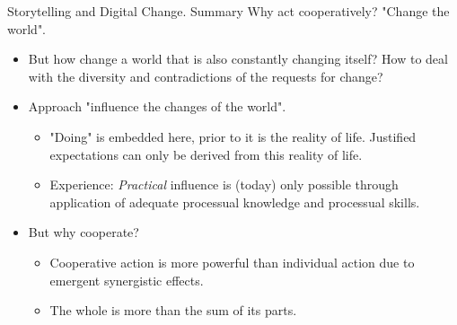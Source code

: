 \documentclass{beamer}
\begin{document}
\begin{frame}{Storytelling and Digital Change. Summary}
Why act cooperatively? "Change the world".
\begin{itemize}
\item But how change a world that is also constantly changing itself?  How to
  deal with the diversity and contradictions of the requests for change?
\item Approach "influence the changes of the world".
  \begin{itemize}
  \item "Doing" is embedded here, prior to it is the reality of life.
    Justified expectations can only be derived from this reality of life.
\item Experience: \emph{Practical} influence is (today) only possible through
  application of adequate processual knowledge and processual skills.
  \end{itemize}
\item But why cooperate?
  \begin{itemize}
  \item Cooperative action is more powerful than individual action due to
    emergent synergistic effects.
  \item The whole is more than the sum of its parts.
  \end{itemize}
\end{itemize}
\end{frame}
\end{document}
